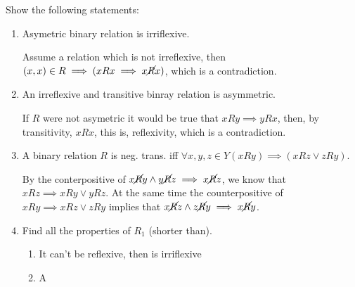 \documentclass{article}
\def\noR{\cancel{R}}
\begin{document}
 Show the following statements:
\begin{enumerate}
\item Asymetric binary relation is irriflexive.

 Assume a relation which is not irreflexive, then $(x,x)\in
R \implies (xRx\implies x\noR x)$, which is a contradiction.

\item An irreflexive and transitive binray relation is asymmetric.

 If $R$ were not asymetric it would be true that $xRy\implies yRx$, then, by
transitivity, $xRx$, this is, reflexivity, which is a contradiction.

\item A binary relation $R$ is neg. trans. iff $\forall x,y,z\in Y (xRy)\implies
(xRz \vee zRy)$.

 By the conterpositive of $x\noR y \wedge y\noR z\implies x\noR z$, we know that
$xRz\implies xRy \vee yRz$. At the same time the counterpositive of $xRy\implies
xRz \vee zRy$ implies that $x\noR z \wedge z\noR y \implies x\noR y$.

\item Find all the properties of $R_1$ (shorter than).

\begin{enumerate}
\item It can't be reflexive, then is irriflexive
\item A
\end{enumerate}
\end{enumerate}
\end{document}
